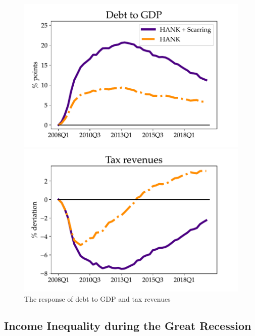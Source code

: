 \begin{figure}[!ht]
    \centering
   \begin{minipage}{0.48\textwidth}
        \centering
        \includegraphics[scale=.57]{text/chapter1/Figures/GR_sim/debt2GDP_GR} %
    \end{minipage}\hfill
    \begin{minipage}{0.48\textwidth}
        \centering
        \includegraphics[scale=.57]{text/chapter1/Figures/GR_sim/tax_rev} %
    \end{minipage}
    \caption{The response of debt to GDP and tax revenues}
    \label{DebtGDP_sim}
\end{figure}




\subsection{Income Inequality during the Great Recession}

